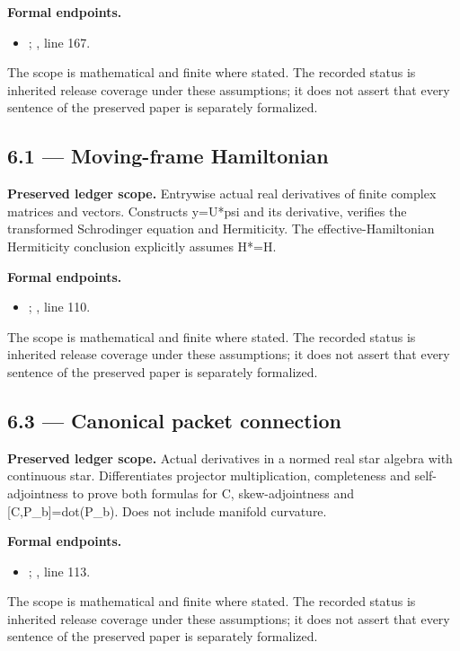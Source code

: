 \textbf{Formal endpoints.}\begin{itemize}
\item {}; , line 167.
\end{itemize}
The scope is mathematical and finite where stated. The recorded status is inherited release coverage under these assumptions; it does not assert that every sentence of the preserved paper is separately formalized.

\subsection{6.1 — Moving-frame Hamiltonian}
\label{result:6.1}
\textbf{Preserved ledger scope.} Entrywise actual real derivatives of finite complex matrices and vectors. Constructs y=U*psi and its derivative, verifies the transformed Schrodinger equation and Hermiticity. The effective-Hamiltonian Hermiticity conclusion explicitly assumes H*=H.

\textbf{Formal endpoints.}\begin{itemize}
\item {}; , line 110.
\end{itemize}
The scope is mathematical and finite where stated. The recorded status is inherited release coverage under these assumptions; it does not assert that every sentence of the preserved paper is separately formalized.

\subsection{6.3 — Canonical packet connection}
\label{result:6.3}
\textbf{Preserved ledger scope.} Actual derivatives in a normed real star algebra with continuous star. Differentiates projector multiplication, completeness and self-adjointness to prove both formulas for C, skew-adjointness and [C,P\_b]=dot(P\_b). Does not include manifold curvature.

\textbf{Formal endpoints.}\begin{itemize}
\item {}; , line 113.
\end{itemize}
The scope is mathematical and finite where stated. The recorded status is inherited release coverage under these assumptions; it does not assert that every sentence of the preserved paper is separately formalized.

